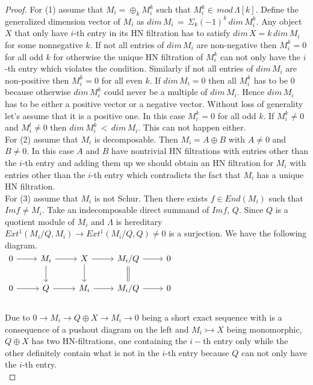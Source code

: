 \begin{proof}
\indent For (1) assume that $M_i = \oplus_{k}M_i^k$ such that $M_i^k\in\, mod\, \Lambda[k]$. Define the generalized dimension vector of $M_i$ as $dim\, M_i\, =\, \Sigma_k (-1)^k\,dim\,M_i^k$. Any object $X$ that only have $i$-th entry in its HN filtration has to satisfy $dim\,X = k\,dim\,M_i$ for some nonnegative $k$.  If not all entries of $dim\, M_i$ are non-negative then $M_i^k = 0$ for all odd $k$ for otherwise the unique HN filtration of $M_i^k$ can not only have the $i$-th entry which violates the condition. Similarly if not all entries of $dim\, M_i$ are non-positive then $M_i^k = 0$ for all even $k$. If $dim\, M_i = 0$ then all $M_i^k$ has to be 0 because otherwise $dim\,M_i^k$ could never be a multiple of $dim\,M_i$. Hence $dim\, M_i$ has to be either a positive vector or a negative vector. Without loss of generality let's assume that it is a positive one. In this case $M_i^k = 0$ for all odd $k$. If $M_i^k \neq 0$ and $M_i^l\neq 0$ then $dim\,M_i^k\,<\,dim\,M_i$. This can not happen either.\\
\indent For (2) assume that $M_i$ is decomposable. Then $M_i = A\oplus B$ with $A\neq 0$ and $B\neq 0$. In this case $A$ and $B$ have nontrivial HN filtrations with entries other than the $i$-th entry and adding them up we should obtain an HN filtration for $M_i$ with entries other than the $i$-th entry which contradicts the fact that $M_i$ has a unique HN filtration.\\
\indent For (3) assume that $M_i$ is not Schur. Then there exists $f\in End(M_i)$ such that $Im f\neq M_i$. Take an indecomposable direct summand of $Im f$, $Q$. Since $Q$ is a quotient module of $M_i$ and $\Lambda$ is hereditary $Ext^1(M_i/Q, M_i)\to Ext^1(M_i/Q, Q) \neq 0$ is a surjection. We have the following diagram.\\
$\begin{tikzcd}
0\arrow[r] & M_i\arrow[r]\arrow[d] & X\arrow[r]\arrow[d] & M_i/Q \arrow[r]\arrow[d,equal] & 0\\
0\arrow[r] & Q \arrow[r] & M_i\arrow[r] & M_i/Q \arrow[r] & 0\\
\end{tikzcd}$\\
\indent Due to $0\to M_i\to Q\oplus X\to M_i\to 0$ being a short exact sequence with is a consequence of a pushout diagram on the left and $M_i\rightarrowtail X$ being monomorphic, $Q\oplus X$ has two HN-filtrations, one containing the $i-$th entry only while the other definitely contain what is not in the $i$-th entry because $Q$ can not only have the $i$-th entry.\\
\end{proof}

